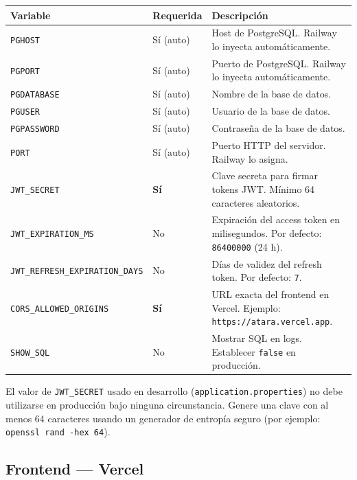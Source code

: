 \documentclass[11pt, a4paper]{article}
\begin{document}
\begin{tabularx}{\textwidth}{L{4.5cm} L{4cm} X}
\toprule
\textbf{Variable} & \textbf{Requerida} & \textbf{Descripción} \\
\midrule
\texttt{PGHOST}          & Sí (auto) & Host de PostgreSQL. Railway lo inyecta automáticamente. \\
\texttt{PGPORT}          & Sí (auto) & Puerto de PostgreSQL. Railway lo inyecta automáticamente. \\
\texttt{PGDATABASE}      & Sí (auto) & Nombre de la base de datos. \\
\texttt{PGUSER}          & Sí (auto) & Usuario de la base de datos. \\
\texttt{PGPASSWORD}      & Sí (auto) & Contraseña de la base de datos. \\
\texttt{PORT}            & Sí (auto) & Puerto HTTP del servidor. Railway lo asigna. \\
\texttt{JWT\_SECRET}     & \textbf{Sí} & Clave secreta para firmar tokens JWT. Mínimo 64 caracteres aleatorios. \\
\texttt{JWT\_EXPIRATION\_MS} & No & Expiración del access token en milisegundos. Por defecto: \texttt{86400000} (24 h). \\
\texttt{JWT\_REFRESH\_EXPIRATION\_DAYS} & No & Días de validez del refresh token. Por defecto: \texttt{7}. \\
\texttt{CORS\_ALLOWED\_ORIGINS} & \textbf{Sí} & URL exacta del frontend en Vercel. Ejemplo: \texttt{https://atara.vercel.app}. \\
\texttt{SHOW\_SQL}       & No & Mostrar SQL en logs. Establecer \texttt{false} en producción. \\
\bottomrule
\end{tabularx}

\vspace{6pt}

\begin{warningbox}
  El valor de \texttt{JWT\_SECRET} usado en desarrollo (\texttt{application.properties}) no debe utilizarse en producción bajo ninguna circunstancia. Genere una clave con al menos 64 caracteres usando un generador de entropía seguro (por ejemplo: \texttt{openssl rand -hex 64}).
\end{warningbox}

\subsection{Frontend --- Vercel}
\end{document}
